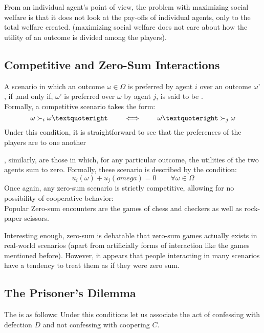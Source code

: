 		From an individual agent’s point of view, the problem with maximizing social welfare is that it does not look at the pay-offs of individual agents, only to the total welfare created. (maximizing social welfare does not care about how the utility of an outcome is divided among the players).
		
\subsection{Competitive and Zero-Sum Interactions}
A scenario in which an outcome $\omega\in\Omega$ is preferred by agent $i$ over an outcome $\omega’$, if ,and only if, $\omega’$ is preferred over $\omega$ by agent $j$, is said to be .\\
	Formally, a competitive scenario takes the form:
	\[\omega \cmore_i \omega’\qquad\iff\qquad\omega’\cmore_j \omega\]
	Under this condition, it is straightforward to see that the preferences of the players are  to one another
	
	, similarly, are those in which, for any particular outcome, the utilities of the two agents sum to zero. Formally, these scenario is described by the condition:
	\[u_i(\omega) + u_j(omega) = 0\qquad \forall \omega \in \Omega\]
	Once again, any zero-sum scenario is strictly competitive, allowing for no possibility of cooperative behavior: \cite{mastxt}\\
	Popular Zero-sum encounters are the games of chess and checkers as well as rock-paper-scissors.
	
	Interesting enough, zero-sum is debatable that zero-sum games actually exists in real-world scenarios (apart from artificially forms of interaction like the games mentioned before). However, it appears that people interacting in many scenarios have a tendency to treat them as if they were zero sum.
	
\subsection{The Prisoner's Dilemma}
The  is as follows:
	\cite{mastxt}
	Under this conditions let us associate the act of confessing with defection $D$ and not confessing with coopering $C$.
	
